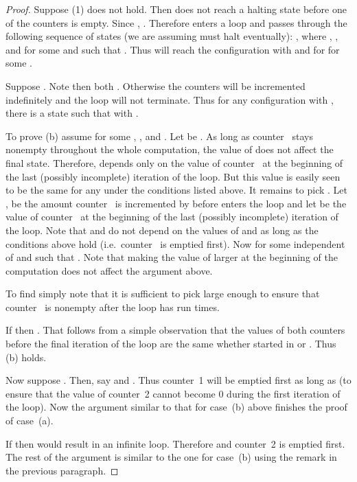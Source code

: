 \documentclass[12pt]{article}
\begin{document}
\begin{proof}
Suppose (1) does not hold. Then  does not reach a halting state
before one of the counters is empty. Since , . 
Therefore  enters
a loop and passes through the following sequence of states (we are
assuming  must halt eventually):
,
where , , and  for some  and
 such that . 
Thus  will reach the configuration  with 
and  for  for some .
 
Suppose . Note then both
. Otherwise the counters will be incremented
indefinitely and the loop will not terminate. Thus for any configuration  with ,  there is a state  such
that  with . 

To prove (b) assume  for some , , and
. Let  be . As long as counter~
stays nonempty throughout the whole computation, the value of  does not affect
the final state. Therefore,  depends only on the value of
counter~ at the beginning of the last (possibly incomplete) iteration of the loop.
But this value is easily seen to be the same for any  under the
conditions listed above. It remains to pick . Let ,  be the
amount counter~ is incremented by before  enters the loop and let
 be the value of counter~ at the beginning of the last
(possibly incomplete) iteration of the loop. Note that  and 
do not depend on the values of  and  as long as the
conditions above hold (i.e.\ counter~ is emptied first). Now
 for some  independent of  and
such that . Note that making the value of  larger at
the beginning of the computation does not affect the argument above.

To find  simply note that it is sufficient to pick  large enough
to ensure that counter~ is nonempty after the loop has run  times.

If  then .
That  follows from a simple observation that the values of
both counters before the final iteration of the loop are the same
whether  started in  or .
Thus (b) holds.

Now suppose . Then, say  and
. Thus counter~1 will be emptied first as long as
 (to ensure that the value of counter~2 cannot become 0
during the first iteration of the loop). Now the argument similar to
that for case~(b) above finishes the proof of case~(a).

If  then  would result in an infinite
loop. Therefore  and counter~2 is emptied first. The rest
of the argument is similar to the one for case~(b) using the remark in
the previous paragraph.
\end{proof}
\end{document}
